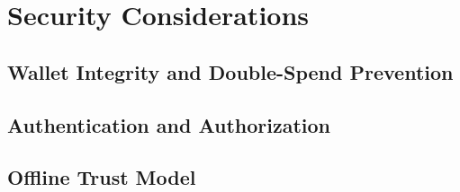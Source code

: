 \chapter{Security Considerations}
\label{chap:security}


\section{Wallet Integrity and Double-Spend Prevention}
\label{sec:double-spend}

\section{Authentication and Authorization}
\label{sec:auth}

\section{Offline Trust Model}
\label{sec:offline-trust}
